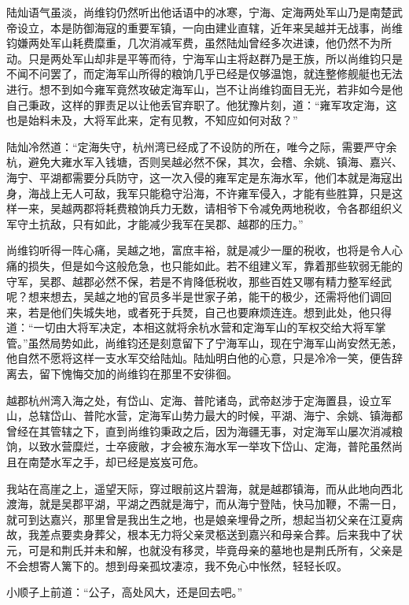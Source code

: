 陆灿语气虽淡，尚维钧仍然听出他话语中的冰寒，宁海、定海两处军山乃是南楚武帝设立，本是防御海寇的重要军镇，一向由建业直辖，近年来吴越并无战事，尚维钧嫌两处军山耗费糜重，几次消减军费，虽然陆灿曾经多次进谏，他仍然不为所动。只是两处军山却非是平等而待，宁海军山主将赵群乃是王族，所以尚维钧只是不闻不问罢了，而定海军山所得的粮饷几乎已经是仅够温饱，就连整修舰艇也无法进行。想不到如今雍军竟然攻破定海军山，岂不让尚维钧面目无光，若非如今是他自己秉政，这样的罪责足以让他丢官弃职了。他犹豫片刻，道：“雍军攻定海，这也是始料未及，大将军此来，定有见教，不知应如何对敌？”

陆灿冷然道：“定海失守，杭州湾已经成了不设防的所在，唯今之际，需要严守余杭，避免大雍水军入钱塘，否则吴越必然不保，其次，会稽、余姚、镇海、嘉兴、海宁、平湖都需要分兵防守，这一次入侵的雍军定是东海水军，他们本就是海寇出身，海战上无人可敌，我军只能稳守沿海，不许雍军侵入，才能有些胜算，只是这样一来，吴越两郡将耗费粮饷兵力无数，请相爷下令减免两地税收，令各郡组织义军守土抗敌，只有如此，才能减少我军在吴郡、越郡的压力。”

尚维钧听得一阵心痛，吴越之地，富庶丰裕，就是减少一厘的税收，也将是令人心痛的损失，但是如今这般危急，也只能如此。若不组建义军，靠着那些软弱无能的守军，吴郡、越郡必然不保，若是不肯降低税收，那些百姓又哪有精力整军经武呢？想来想去，吴越之地的官员多半是世家子弟，能干的极少，还需将他们调回来，若是他们失城失地，或者死于兵燹，自己也要麻烦连连。想到此处，他只得道：“一切由大将军决定，本相这就将余杭水营和定海军山的军权交给大将军掌管。”虽然局势如此，尚维钧还是刻意留下了宁海军山，现在宁海军山尚安然无恙，他自然不愿将这样一支水军交给陆灿。陆灿明白他的心意，只是冷冷一笑，便告辞离去，留下愧悔交加的尚维钧在那里不安徘徊。

越郡杭州湾入海之处，有岱山、定海、普陀诸岛，武帝赵涉于定海置县，设立军山，总辖岱山、普陀水营，定海军山势力最大的时候，平湖、海宁、余姚、镇海都曾经在其管辖之下，直到尚维钧秉政之后，因为海疆无事，对定海军山屡次消减粮饷，以致水营糜烂，士卒疲敝，才会被东海水军一举攻下岱山、定海，普陀虽然尚且在南楚水军之手，却已经是岌岌可危。

我站在高崖之上，遥望天际，穿过眼前这片碧海，就是越郡镇海，而从此地向西北渡海，就是吴郡平湖，平湖之西就是海宁，而从海宁登陆，快马加鞭，不需一日，就可到达嘉兴，那里曾是我出生之地，也是娘亲埋骨之所，想起当初父亲在江夏病故，我差点要卖身葬父，根本无力将父亲灵柩送到嘉兴和母亲合葬。后来我中了状元，可是和荆氏并未和解，也就没有移灵，毕竟母亲的墓地也是荆氏所有，父亲是不会想寄人篱下的。想到母亲孤坟凄凉，我不免心中怅然，轻轻长叹。

小顺子上前道：“公子，高处风大，还是回去吧。”

